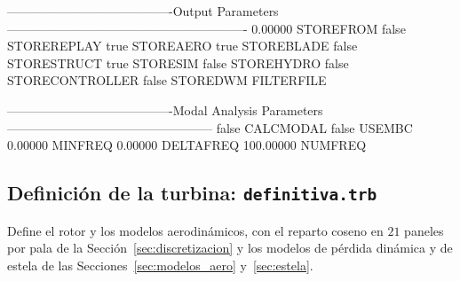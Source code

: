\begin{cfgcode}
----------------------------------------Output Parameters----------------------------------------------------------
0.00000                                STOREFROM
false                                  STOREREPLAY
true                                   STOREAERO
true                                   STOREBLADE
false                                  STORESTRUCT
true                                   STORESIM
false                                  STOREHYDRO
false                                  STORECONTROLLER
false                                  STOREDWM
                                       FILTERFILE

----------------------------------------Modal Analysis Parameters--------------------------------------------------
false                                  CALCMODAL
false                                  USEMBC
0.00000                                MINFREQ
0.00000                                DELTAFREQ
100.00000                              NUMFREQ
\end{cfgcode}


\subsection*{Definición de la turbina: \texttt{definitiva.trb}}
\label{sec:anexo_trb}

Define el rotor y los modelos aerodinámicos, con el reparto coseno
en $21$ paneles por pala de la Sección~\ref{sec:discretizacion} y los modelos de pérdida
dinámica y de estela de las Secciones~\ref{sec:modelos_aero} y~\ref{sec:estela}.

